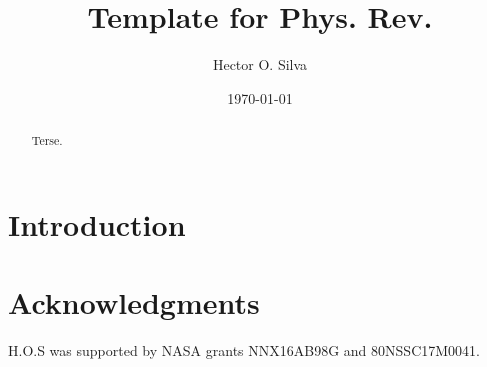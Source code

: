 \documentclass[aps, 10pt, prd,
               notitlepage, twocolumn, superscriptaddress,
               nofootinbib]{revtex4-2}
\begin{document}
\title{Template for Phys. Rev.}

\begin{abstract}
Terse.
\end{abstract}

\author{Hector O. Silva}

\date{{\today}}

\maketitle

\section{Introduction}

\section*{Acknowledgments}
%
H.O.S was supported by NASA grants NNX16AB98G and 80NSSC17M0041.



\end{document}
